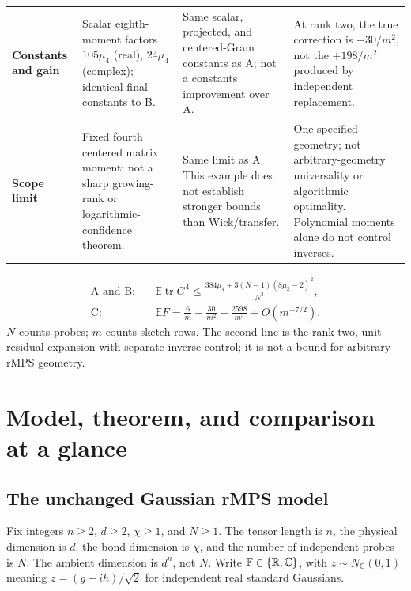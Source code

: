 \documentclass[11pt]{article}
\numberwithin{equation}{section}
\theoremstyle{definition}\newtheorem{definition}[theorem]{Definition}
\theoremstyle{remark}\newtheorem{remark}[theorem]{Remark}
\newcommand{\R}{\mathbb R}\newcommand{\E}{\mathbb E}\newcommand{\Prob}{\mathbb P}
\newcommand{\tr}{\operatorname{tr}}\newcommand{\Ent}{\operatorname{Ent}}
\newcommand{\C}{\mathbb C}
\begin{document}
\begin{tabularx}{\textwidth}{@{}P{.14\textwidth}YYY@{}}
\textbf{Constants and gain} &
Scalar eighth-moment factors $105\mu_4$ (real), $24\mu_4$ (complex);
identical final constants to B. &
Same scalar, projected, and centered-Gram constants as A;
not a constants improvement over A. &
At rank two, the true correction is $-30/m^2$, not the $+198/m^2$
produced by independent replacement.\\[3pt]
\textbf{Scope limit} &
Fixed fourth centered matrix moment; not a sharp growing-rank or
logarithmic-confidence theorem. &
Same limit as A. This example does not establish stronger bounds than
Wick/transfer. &
One specified geometry; not arbitrary-geometry universality or
algorithmic optimality. Polynomial moments alone do not control inverses.\\[3pt]
\bottomrule
\end{tabularx}
\endgroup

\vspace{1.5mm}
\begin{takeaway}[title={Quantitative endpoints (real case)},
  top=3pt,bottom=3pt,before skip=3pt,after skip=3pt]
\small
\setlength{\abovedisplayskip}{3pt}
\setlength{\belowdisplayskip}{3pt}
\[
\begin{aligned}
 \text{A and B:}\quad &\E\tr G^4\le
 \frac{384\mu_4+3(N-1)(8\mu_2-2)^2}{N^3},\\[3pt]
 \text{C:}\quad &\E F=\frac6m-\frac{30}{m^2}+\frac{2598}{m^3}+O(m^{-7/2}).
\end{aligned}
\]
{\footnotesize $N$ counts probes; $m$ counts sketch rows.
The second line is the rank-two, unit-residual expansion with separate inverse
control; it is not a bound for arbitrary rMPS geometry.}
\end{takeaway}
\clearpage

\section{Model, theorem, and comparison at a glance}\label{sec:model}
\subsection{The unchanged Gaussian rMPS model}
Fix integers $n\ge2$, $d\ge2$, $\chi\ge1$, and $N\ge1$. The tensor length is $n$,
the physical dimension is $d$, the bond dimension is $\chi$, and the number of
independent probes is $N$. The ambient dimension is $d^n$, not $N$.
Write $\F\in\{\R,\C\}$, with $z\sim N_{\C}(0,1)$ meaning
$z=(g+ih)/\sqrt2$ for independent real standard Gaussians.
\end{document}
